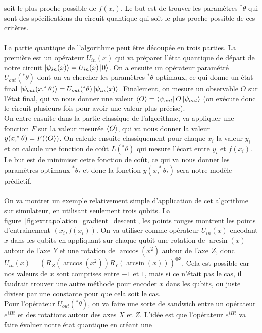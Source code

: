 soit le plus proche possible de $f(x_i)$.
Le but est de trouver les paramètres $^*\theta$ qui sont des spécifications du circuit
quantique qui soit le plus proche possible de ces critères.\\ \\
La partie quantique de l'algorithme peut être découpée en trois parties.
La première est un opérateur $U_{in}(x)$ qui va préparer l'état quantique de départ de notre
circuit $\ket{\psi_{in}(x)}=U_{in}(x)\ket{0}$.
On a ensuite un opérateur paramétré $U_{out}(^*\theta)$ dont on va chercher les paramètres
$^*\theta$ optimaux, ce qui donne un état final $\ket{\psi_{out}(x, ^*\theta)}=U_{out}(^*\theta)\ket{\psi_{in}(x)}$.
Finalement, on mesure un observable $O$ sur l'état final, qui va nous donner une valeur
$\expval{O}=\bra{\psi_{out}}O\ket{\psi_{out}}$ (on exécute donc le circuit
plusieurs fois pour avoir une valeur plus précise).\\
On entre ensuite dans la partie classique de l'algorithme, va appliquer une fonction $F$ sur
la valeur mesurée $\expval{O}$, qui va nous donner la valeur $y(x, ^*\theta) = F(\expval{O})$.
On calcule ensuite classiquement pour chaque $x_i$ la valeur $y_i$ et on calcule une fonction
de coût $L(^*\theta)$ qui mesure l'écart entre $y_i$ et $f(x_i)$.
Le but est de minimiser cette fonction de coût, ce qui va nous donner les paramètres optimaux
$^*\theta_t$ et donc la fonction $y(x, ^*\theta_t)$ sera notre modèle prédictif.\\ \\
On va montrer un exemple relativement simple d'application de cet algorithme sur simulateur,
en utilisant seulement trois qubits.
La figure~\ref{fig:extrapolation_gradient_descent}, les points rouges montrent les points
d'entrainement $(x_i, f(x_i))$.
On va utiliser comme opérateur $U_{in}(x)$ encodant $x$ dans les qubits en appliquant
sur chaque qubit une rotation de $\arcsin(x)$ autour de l'axe $Y$ et une rotation de
$\arccos(x^2)$ autour de l'axe $Z$, donc $U_{in}(x) = (R_Z(\arccos(x^2)) R_Y(\arcsin(x)))^{\otimes 3}$.
Cela est possible car nos valeurs de $x$ sont comprises entre $-1$ et $1$, mais si ce n'était
pas le cas, il faudrait trouver une autre méthode pour encoder $x$ dans les qubits, ou juste
diviser par une constante pour que cela soit le cas.\\
Pour l'opérateur $U_{out}(^*\theta)$, on va faire une sorte de sandwich entre un opérateur
$e^{iHt}$ et des rotations autour des axes $X$ et $Z$.
L'idée est que l'opérateur $e^{iHt}$ va faire évoluer notre état quantique en créant une

